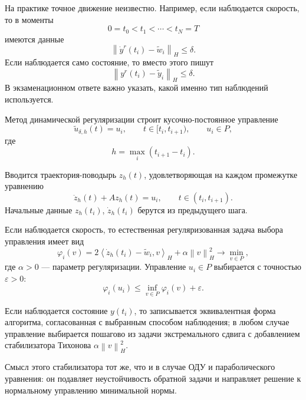 \documentclass[12pt,a4paper]{article}
\newcommand{\norm}[1]{\left\lVert #1\right\rVert}
\newcommand{\inner}[2]{\left\langle #1,#2\right\rangle}
\begin{document}
На практике точное движение неизвестно. Например, если наблюдается скорость, то в моменты
\[
    0=t_0<t_1<\cdots<t_N=T
\]
имеются данные
\begin{equation}
    \norm{\dot y^r(t_i)-\tilde w_i}_H\le \delta.
\end{equation}
Если наблюдается само состояние, то вместо этого пишут
\begin{equation}
    \norm{y^r(t_i)-\tilde y_i}_H\le \delta.
\end{equation}
В экзаменационном ответе важно указать, какой именно тип наблюдений используется.

Метод динамической регуляризации строит кусочно-постоянное управление
\begin{equation}
    \tilde u_{\delta,h}(t)=u_i,
    \qquad t\in[t_i,t_{i+1}),
    \qquad u_i\in P,
\end{equation}
где
\begin{equation}
    h=\max_i(t_{i+1}-t_i).
\end{equation}

Вводится траектория-поводырь $z_h(t)$, удовлетворяющая на каждом промежутке уравнению
\begin{equation}
    \ddot z_h(t)+Az_h(t)=u_i,
    \qquad t\in(t_i,t_{i+1}).
\end{equation}
Начальные данные $z_h(t_i)$, $\dot z_h(t_i)$ берутся из предыдущего шага.

Если наблюдается скорость, то естественная регуляризованная задача выбора управления имеет вид
\begin{equation}
    \varphi_i(v)
    =2\inner{\dot z_h(t_i)-\tilde w_i}{v}_H
    +\alpha\norm{v}_H^2
    \to \min_{v\in P},
\end{equation}
где $\alpha>0$ --- параметр регуляризации. Управление $u_i\in P$ выбирается с точностью $\varepsilon>0$:
\begin{equation}
    \varphi_i(u_i)\le \inf_{v\in P}\varphi_i(v)+\varepsilon.
\end{equation}

Если наблюдается состояние $y(t_i)$, то записывается эквивалентная форма алгоритма, согласованная с выбранным способом наблюдения; в любом случае управление выбирается пошагово из задачи экстремального сдвига с добавлением стабилизатора Тихонова $\alpha\norm{v}_H^2$.

Смысл этого стабилизатора тот же, что и в случае ОДУ и параболического уравнения: он подавляет неустойчивость обратной задачи и направляет решение к нормальному управлению минимальной нормы.
\end{document}
